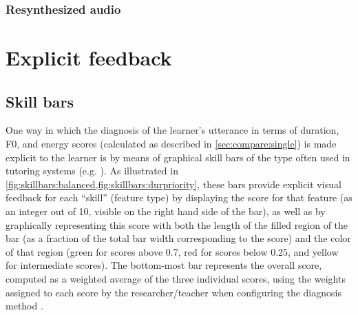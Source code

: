 			\subsubsection{Resynthesized audio}
			\label{sec:implicit:auditory:resynth}
			
			
			
	\section{Explicit feedback}
		\subsection{Skill bars}
		
		
		One way in which 
		the diagnosis of the learner's utterance in terms of duration, F0, and energy scores (calculated as
		described in \cref{sec:compare:single}) is made explicit to the learner is by means of graphical skill bars of the type often used in tutoring systems (e.g. \cite{Long2011,Long2013}).
		As illustrated in \cref{fig:skillbars:balanced,fig:skillbars:durpriority}, these bars provide explicit visual feedback for each ``skill'' (feature type) by displaying the score for that feature (as an integer out of 10, visible on the right hand side of the bar), as well as by graphically representing this score with both the length of the filled region of the bar (as a fraction of the total bar width corresponding to the score) and the color of that region (green for scores above 0.7, red for scores below 0.25, and yellow for intermediate scores).
		 The bottom-most bar represents the overall score, computed as a weighted average of the three individual scores, using the weights assigned to each score by the researcher/teacher when configuring the diagnosis method .
		 
